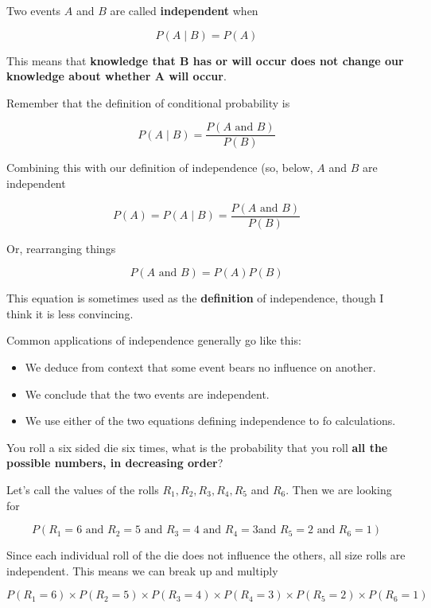 \begin{frame}

Two events $A$ and $B$ are called \textbf{independent} when

$$ P(A \mid B) = P(A) $$

This means that \textbf{knowledge that B has or will occur does not change our
knowledge about whether A will occur}.

\end{frame}
%

%
\begin{frame}

Remember that the definition of conditional probability is

$$ P(A \mid B) = \frac{P(A \text{ and } B)}{P(B)} $$

Combining this with our definition of independence (so, below, $A$ and $B$ are
independent

$$ P(A) = P(A \mid B) = \frac{P(A \text{ and } B)}{P(B)} $$

Or, rearranging things

$$ P(A \text{ and } B) = P(A) P(B) $$

This equation is sometimes used as the \textbf{definition} of independence,
though I think it is less convincing.

\end{frame}
%

%
\begin{frame}

Common applications of independence generally go like this:

\begin{itemize}
\item We deduce from context that some event bears no influence on another.
\item We conclude that the two events are independent.
\item We use either of the two equations defining independence to fo
calculations.
\end{itemize}

\end{frame}
%

%
\begin{frame}

You roll a six sided die six times, what is the probability that you roll
\textbf{all
the possible numbers, in decreasing order}?

\end{frame}
%

%
\begin{frame}

Let's call the values of the rolls $R_1, R_2, R_3, R_4, R_5$ and $R_6$.  Then we
are looking for

$$P(R_1 = 6 \text{ and } R_2 = 5 \text{ and } R_3 = 4\text{ and } R_4 = 3 \text{
and } R_5 = 2 \text{ and } R_6 = 1)$$

Since each individual roll of the die does not influence the others, all size
rolls are independent.  This means we can break up and multiply

$$ P(R_1 = 6) \times P(R_2 = 5) \times P(R_3 = 4) \times P(R_4 = 3) \times P(R_5
= 2) \times P(R_6 = 1) $$

\end{frame}
%

